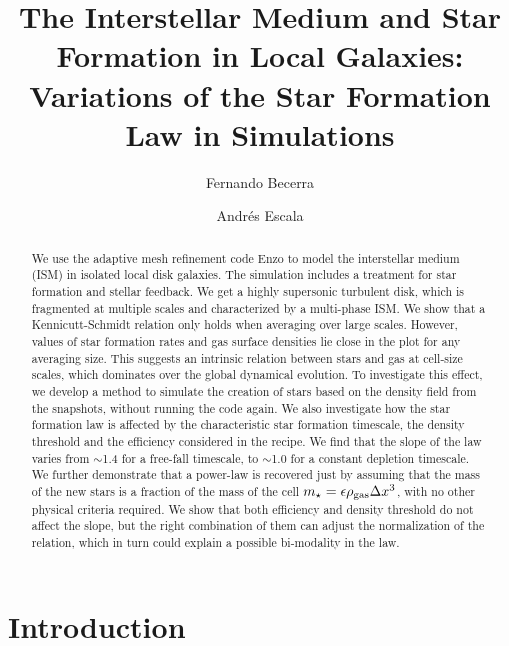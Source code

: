 \documentclass[twocolumn]{aastex}
\newcommand{\mstar}{m_\star}
\newcommand{\rhogas}{\rho_{\rm gas}}
\begin{document}
\title{The Interstellar Medium and Star Formation in Local Galaxies: Variations of the Star Formation Law in Simulations}
\author{Fernando Becerra}
\author{Andr\'es Escala}


\begin{abstract}
We use the adaptive mesh refinement code Enzo to model the interstellar medium (ISM) in isolated local disk galaxies. The simulation includes a treatment for star formation and stellar feedback. We get a highly supersonic turbulent disk, which is fragmented at multiple scales and characterized by a multi-phase ISM. We show that a Kennicutt-Schmidt relation only holds when averaging over large scales. However, values of star formation rates and gas surface densities lie close in the plot for any averaging size. This suggests an intrinsic relation between stars and gas at cell-size scales, which dominates over the global dynamical evolution. To investigate this effect, we develop a method to simulate the creation of stars based on the density field from the snapshots, without running the code again. We also investigate how the star formation law is affected by the characteristic star formation timescale, the density threshold and the efficiency considered in the recipe. We find that the slope of the law varies from $\sim$1.4 for a free-fall timescale, to $\sim$1.0 for a constant depletion timescale. We further demonstrate that a power-law is recovered just by assuming that the mass of the new stars is a fraction of the mass of the cell $\mstar=\epsilon\rhogas\Delta x^3$, with no other physical criteria required. We show that both efficiency and density threshold do not affect the slope, but the right combination of them can adjust the normalization of the relation, which in turn could explain a possible bi-modality in the law.
\end{abstract}



\section{Introduction}
\end{document}
